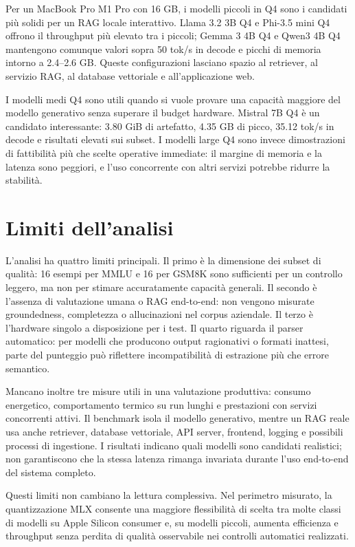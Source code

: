 Per un MacBook Pro M1 Pro con 16 GB, i modelli piccoli in Q4 sono i candidati
più solidi per un RAG locale interattivo. Llama 3.2 3B Q4 e Phi-3.5 mini Q4
offrono il throughput più elevato tra i piccoli; Gemma 3 4B Q4 e Qwen3 4B Q4
mantengono comunque valori sopra 50 tok/s in decode e picchi di memoria intorno
a 2.4--2.6 GB. Queste configurazioni lasciano spazio al retriever, al servizio
RAG, al database vettoriale e all'applicazione web.

I modelli medi Q4 sono utili quando si vuole provare una capacità maggiore del
modello generativo senza superare il budget hardware. Mistral 7B Q4 è
un candidato interessante: 3.80 GiB di artefatto, 4.35 GB di picco, 35.12
tok/s in decode e risultati elevati sui subset. I modelli large Q4 sono invece
dimostrazioni di fattibilità più che scelte operative immediate: il margine
di memoria e la latenza sono peggiori, e l'uso concorrente con altri servizi
potrebbe ridurre la stabilità.

\section{Limiti dell'analisi}
\label{sec:evaluation_limits}

L'analisi ha quattro limiti principali. Il primo è la dimensione dei subset di
qualità: 16 esempi per MMLU e 16 per GSM8K sono sufficienti per un controllo
leggero, ma non per stimare accuratamente capacità generali. Il secondo è
l'assenza di valutazione umana o RAG end-to-end: non vengono misurate
groundedness, completezza o allucinazioni nel corpus aziendale. Il terzo è
l'hardware singolo a disposizione per i test. Il quarto riguarda il parser automatico: per
modelli che producono output ragionativi o formati inattesi, parte del punteggio
può riflettere incompatibilità di estrazione più che errore semantico.

Mancano inoltre tre misure utili in una valutazione produttiva: consumo
energetico, comportamento termico su run lunghi e prestazioni con servizi
concorrenti attivi. Il benchmark isola il modello generativo, mentre un RAG
reale usa anche retriever, database vettoriale, API server, frontend, logging e
possibili processi di ingestione. I risultati indicano quali modelli sono
candidati realistici; non garantiscono che la stessa latenza rimanga invariata
durante l'uso end-to-end del sistema completo.

Questi limiti non cambiano la lettura complessiva. Nel perimetro misurato, la
quantizzazione MLX consente una maggiore flessibilità di scelta tra molte 
classi di modelli su Apple Silicon consumer e, su modelli piccoli, aumenta efficienza e 
throughput senza perdita di qualità osservabile nei controlli automatici realizzati.

